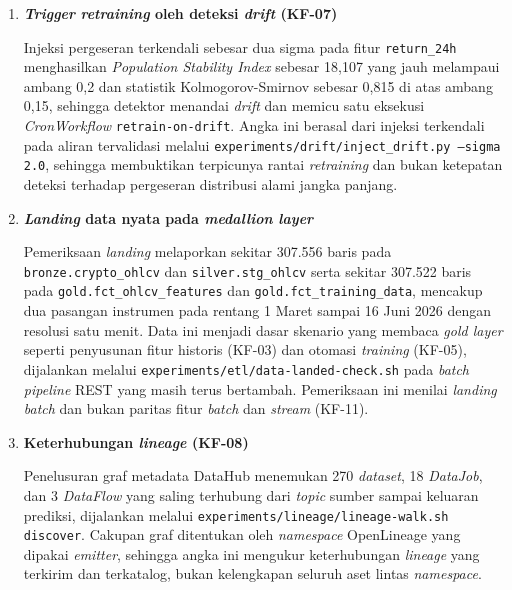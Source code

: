 \vspace{0.5em}
\begin{enumerate}
    \item \textbf{\textit{Trigger} \textit{retraining} oleh deteksi \textit{drift} (KF-07)}

    Injeksi pergeseran terkendali sebesar dua sigma pada fitur \texttt{return\_24h} menghasilkan \textit{Population Stability Index} sebesar 18,107 yang jauh melampaui ambang 0,2 dan statistik Kolmogorov-Smirnov sebesar 0,815 di atas ambang 0,15, sehingga detektor menandai \textit{drift} dan memicu satu eksekusi \textit{CronWorkflow} \texttt{retrain-on-drift}. Angka ini berasal dari injeksi terkendali pada aliran tervalidasi melalui \texttt{experiments/drift/inject\_drift.py --sigma 2.0}, sehingga membuktikan terpicunya rantai \textit{retraining} dan bukan ketepatan deteksi terhadap pergeseran distribusi alami jangka panjang.

    \vspace{0.5em}

    \item \textbf{\textit{Landing} data nyata pada \textit{medallion layer}}

    Pemeriksaan \textit{landing} melaporkan sekitar 307.556 baris pada \texttt{bronze.crypto\_ohlcv} dan \texttt{silver.stg\_ohlcv} serta sekitar 307.522 baris pada \texttt{gold.fct\_ohlcv\_features} dan \texttt{gold.fct\_training\_data}, mencakup dua pasangan instrumen pada rentang 1 Maret sampai 16 Juni 2026 dengan resolusi satu menit. Data ini menjadi dasar skenario yang membaca \textit{gold layer} seperti penyusunan fitur historis (KF-03) dan otomasi \textit{training} (KF-05), dijalankan melalui \texttt{experiments/etl/data-landed-check.sh} pada \textit{batch pipeline} REST yang masih terus bertambah. Pemeriksaan ini menilai \textit{landing} \textit{batch} dan bukan paritas fitur \textit{batch} dan \textit{stream} (KF-11).

    \vspace{0.5em}

    \item \textbf{Keterhubungan \textit{lineage} (KF-08)}

    Penelusuran graf metadata DataHub menemukan 270 \textit{dataset}, 18 \textit{DataJob}, dan 3 \textit{DataFlow} yang saling terhubung dari \textit{topic} sumber sampai keluaran prediksi, dijalankan melalui \texttt{experiments/lineage/lineage-walk.sh discover}. Cakupan graf ditentukan oleh \textit{namespace} OpenLineage yang dipakai \textit{emitter}, sehingga angka ini mengukur keterhubungan \textit{lineage} yang terkirim dan terkatalog, bukan kelengkapan seluruh aset lintas \textit{namespace}.


\end{enumerate}
